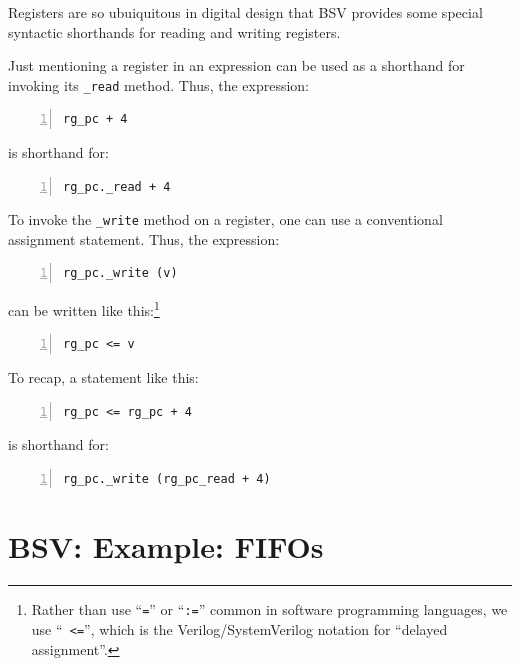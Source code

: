 \label{}


Registers are so ubuiquitous in digital design that BSV provides some
special syntactic shorthands for reading and writing registers.

Just mentioning a register in an expression can be used as a shorthand
for invoking its \verb|_read| method.  Thus, the expression:

\begin{Verbatim}[frame=single, numbers=left]
    rg_pc + 4
\end{Verbatim}

is shorthand for:

\begin{Verbatim}[frame=single, numbers=left]
    rg_pc._read + 4
\end{Verbatim}

To invoke the \verb|_write| method on a register, one can use a
conventional assignment statement.  Thus, the expression:

\begin{Verbatim}[frame=single, numbers=left]
    rg_pc._write (v)
\end{Verbatim}

can be written like this:\footnote{Rather than use ``{\tt =}'' or
``{\tt :=}'' common in software programming languages, we use ``{\tt
<=}'', which is the Verilog/SystemVerilog notation for ``delayed
assignment''.}

\begin{Verbatim}[frame=single, numbers=left]
    rg_pc <= v
\end{Verbatim}

To recap, a statement like this:

\begin{Verbatim}[frame=single, numbers=left]
    rg_pc <= rg_pc + 4
\end{Verbatim}

is shorthand for:

\begin{Verbatim}[frame=single, numbers=left]
    rg_pc._write (rg_pc_read + 4)
\end{Verbatim}


\section{BSV: Example: FIFOs}

